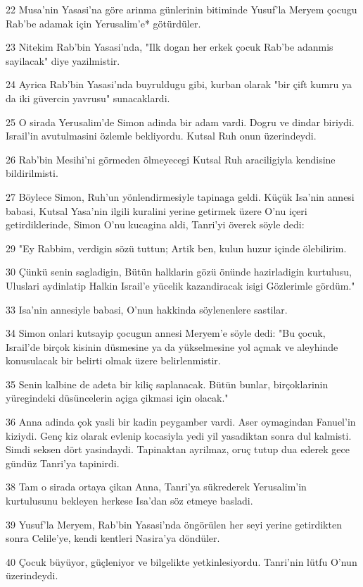 \par 22 Musa'nin Yasasi'na göre arinma günlerinin bitiminde Yusuf'la Meryem çocugu Rab'be adamak için Yerusalim'e* götürdüler.
\par 23 Nitekim Rab'bin Yasasi'nda, "Ilk dogan her erkek çocuk Rab'be adanmis sayilacak" diye yazilmistir.
\par 24 Ayrica Rab'bin Yasasi'nda buyruldugu gibi, kurban olarak "bir çift kumru ya da iki güvercin yavrusu" sunacaklardi.
\par 25 O sirada Yerusalim'de Simon adinda bir adam vardi. Dogru ve dindar biriydi. Israil'in avutulmasini özlemle bekliyordu. Kutsal Ruh onun üzerindeydi.
\par 26 Rab'bin Mesihi'ni görmeden ölmeyecegi Kutsal Ruh araciligiyla kendisine bildirilmisti.
\par 27 Böylece Simon, Ruh'un yönlendirmesiyle tapinaga geldi. Küçük Isa'nin annesi babasi, Kutsal Yasa'nin ilgili kuralini yerine getirmek üzere O'nu içeri getirdiklerinde, Simon O'nu kucagina aldi, Tanri'yi överek söyle dedi:
\par 29 "Ey Rabbim, verdigin sözü tuttun; Artik ben, kulun huzur içinde ölebilirim.
\par 30 Çünkü senin sagladigin, Bütün halklarin gözü önünde hazirladigin kurtulusu, Uluslari aydinlatip Halkin Israil'e yücelik kazandiracak isigi Gözlerimle gördüm."
\par 33 Isa'nin annesiyle babasi, O'nun hakkinda söylenenlere sastilar.
\par 34 Simon onlari kutsayip çocugun annesi Meryem'e söyle dedi: "Bu çocuk, Israil'de birçok kisinin düsmesine ya da yükselmesine yol açmak ve aleyhinde konusulacak bir belirti olmak üzere belirlenmistir.
\par 35 Senin kalbine de adeta bir kiliç saplanacak. Bütün bunlar, birçoklarinin yüregindeki düsüncelerin açiga çikmasi için olacak."
\par 36 Anna adinda çok yasli bir kadin peygamber vardi. Aser oymagindan Fanuel'in kiziydi. Genç kiz olarak evlenip kocasiyla yedi yil yasadiktan sonra dul kalmisti. Simdi seksen dört yasindaydi. Tapinaktan ayrilmaz, oruç tutup dua ederek gece gündüz Tanri'ya tapinirdi.
\par 38 Tam o sirada ortaya çikan Anna, Tanri'ya sükrederek Yerusalim'in kurtulusunu bekleyen herkese Isa'dan söz etmeye basladi.
\par 39 Yusuf'la Meryem, Rab'bin Yasasi'nda öngörülen her seyi yerine getirdikten sonra Celile'ye, kendi kentleri Nasira'ya döndüler.
\par 40 Çocuk büyüyor, güçleniyor ve bilgelikte yetkinlesiyordu. Tanri'nin lütfu O'nun üzerindeydi.
